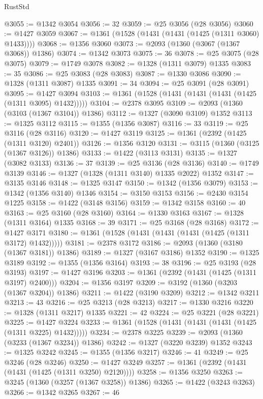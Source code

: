 \begin{lexlean}{RustStd}
\begin{coremodule}
@3055 := @1342 @3054
@3056 := 32
@3059 := @25 @3056 (@28 @3056)
@3060 := @1427 @3059
@3067 := @1361 (@1528 (@1431 (@1431 (@1425 (@1311 @3060) @1433))))
@3068 := @1356 @3060
@3073 := @2093 (@1360 (@3067 (@1367 @3068)) @1386)
@3074 := @1342 @3073
@3075 := 36
@3078 := @25 @3075 (@28 @3075)
@3079 := @1749 @3078
@3082 := @1328 (@1311 @3079) @1335
@3083 := 35
@3086 := @25 @3083 (@28 @3083)
@3087 := @1330 @3086
@3090 := @1328 (@1311 @3087) @1335
@3091 := 34
@3094 := @25 @3091 (@28 @3091)
@3095 := @1427 @3094
@3103 := @1361 (@1528 (@1431 (@1431 (@1431 (@1425 (@1311 @3095) @1432)))))
@3104 := @2378 @3095
@3109 := @2093 (@1360 (@3103 (@1367 @3104)) @1386)
@3112 := @1327 (@3090 @3109) @1352
@3113 := @1325 @3112
@3115 := @1355 (@1356 @3087)
@3116 := 33
@3119 := @25 @3116 (@28 @3116)
@3120 := @1427 @3119
@3125 := @1361 (@2392 (@1425 (@1311 @3120) @2401))
@3126 := @1356 @3120
@3131 := @3115 (@1360 (@3125 (@1367 @3126)) @1386)
@3133 := @1422 (@3113 @3131)
@3135 := @1327 (@3082 @3133)
@3136 := 37
@3139 := @25 @3136 (@28 @3136)
@3140 := @1749 @3139
@3146 := @1327 (@1328 (@1311 @3140) @1335 @2022) @1352
@3147 := @3135 @3146
@3148 := @1325 @3147
@3150 := @1342 (@1356 @3079)
@3153 := @1342 (@1356 @3140) @1346
@3154 := @3150 @3153
@3156 := @2430 @3154 @1225
@3158 := @1422 (@3148 @3156)
@3159 := @1342 @3158
@3160 := 40
@3163 := @25 @3160 (@28 @3160)
@3164 := @1330 @3163
@3167 := @1328 (@1311 @3164) @1335
@3168 := 39
@3171 := @25 @3168 (@28 @3168)
@3172 := @1427 @3171
@3180 := @1361 (@1528 (@1431 (@1431 (@1431 (@1425 (@1311 @3172) @1432)))))
@3181 := @2378 @3172
@3186 := @2093 (@1360 (@3180 (@1367 @3181)) @1386)
@3189 := @1327 (@3167 @3186) @1352
@3190 := @1325 @3189
@3192 := @1355 (@1356 @3164)
@3193 := 38
@3196 := @25 @3193 (@28 @3193)
@3197 := @1427 @3196
@3203 := @1361 (@2392 (@1431 (@1425 (@1311 @3197) @2400)))
@3204 := @1356 @3197
@3209 := @3192 (@1360 (@3203 (@1367 @3204)) @1386)
@3211 := @1422 (@3190 @3209)
@3212 := @1342 @3211
@3213 := 43
@3216 := @25 @3213 (@28 @3213)
@3217 := @1330 @3216
@3220 := @1328 (@1311 @3217) @1335
@3221 := 42
@3224 := @25 @3221 (@28 @3221)
@3225 := @1427 @3224
@3233 := @1361 (@1528 (@1431 (@1431 (@1431 (@1425 (@1311 @3225) @1432)))))
@3234 := @2378 @3225
@3239 := @2093 (@1360 (@3233 (@1367 @3234)) @1386)
@3242 := @1327 (@3220 @3239) @1352
@3243 := @1325 @3242
@3245 := @1355 (@1356 @3217)
@3246 := 41
@3249 := @25 @3246 (@28 @3246)
@3250 := @1427 @3249
@3257 := @1361 (@2392 (@1431 (@1431 (@1425 (@1311 @3250) @2120))))
@3258 := @1356 @3250
@3263 := @3245 (@1360 (@3257 (@1367 @3258)) @1386)
@3265 := @1422 (@3243 @3263)
@3266 := @1342 @3265
@3267 := 46

\end{coremodule}
\end{lexlean}
